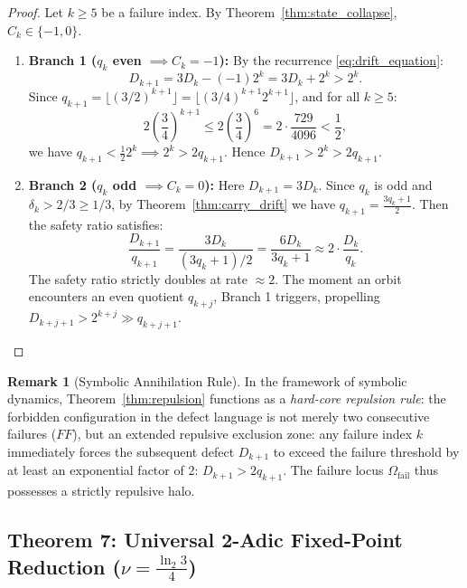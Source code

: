 \documentclass[11pt,reqno]{amsart}
\theoremstyle{definition}
\newtheorem{remark}[theorem]{Remark}
\numberwithin{equation}{section}
\begin{document}
\begin{proof}
Let $k \ge 5$ be a failure index. By Theorem~\ref{thm:state_collapse}, $C_k \in \{-1, 0\}$.
\begin{enumerate}
    \item \textbf{Branch 1 ($q_k$ even $\implies C_k = -1$):}
    By the recurrence \eqref{eq:drift_equation}:
    \[
    D_{k+1} = 3 D_k - (-1) 2^k = 3 D_k + 2^k > 2^k.
    \]
    Since $q_{k+1} = \lfloor (3/2)^{k+1} \rfloor = \lfloor (3/4)^{k+1} 2^{k+1} \rfloor$, and for all $k \ge 5$:
    \[
    2 \left(\frac{3}{4}\right)^{k+1} \le 2 \left(\frac{3}{4}\right)^6 = 2 \cdot \frac{729}{4096} < \frac{1}{2},
    \]
    we have $q_{k+1} < \frac{1}{2} 2^k \implies 2^k > 2 q_{k+1}$.
    Hence $D_{k+1} > 2^k > 2 q_{k+1}$.
    \item \textbf{Branch 2 ($q_k$ odd $\implies C_k = 0$):}
    Here $D_{k+1} = 3 D_k$. Since $q_k$ is odd and $\delta_k > 2/3 \ge 1/3$, by Theorem~\ref{thm:carry_drift} we have $q_{k+1} = \frac{3 q_k + 1}{2}$.
    Then the safety ratio satisfies:
    \[
    \frac{D_{k+1}}{q_{k+1}} = \frac{3 D_k}{(3 q_k + 1)/2} = \frac{6 D_k}{3 q_k + 1} \approx 2 \cdot \frac{D_k}{q_k}.
    \]
    The safety ratio strictly doubles at rate $\approx 2$. The moment an orbit encounters an even quotient $q_{k+j}$, Branch 1 triggers, propelling $D_{k+j+1} > 2^{k+j} \gg q_{k+j+1}$. \qedhere
\end{enumerate}
\end{proof}

\begin{remark}[Symbolic Annihilation Rule]
In the framework of symbolic dynamics, Theorem~\ref{thm:repulsion} functions as a \emph{hard-core repulsion rule}: the forbidden configuration in the defect language is not merely two consecutive failures ($F F$), but an extended repulsive exclusion zone: any failure index $k$ immediately forces the subsequent defect $D_{k+1}$ to exceed the failure threshold by at least an exponential factor of 2: $D_{k+1} > 2 q_{k+1}$. The failure locus $\Omega_{\mathrm{fail}}$ thus possesses a strictly repulsive halo.
\end{remark}

\subsection{\texorpdfstring{Theorem 7: Universal 2-Adic Fixed-Point Reduction ($\nu = \frac{\ln_2 3}{4}$)}{Theorem 7: Universal 2-Adic Fixed-Point Reduction (nu = ln 3 / 4)}}
\end{document}
